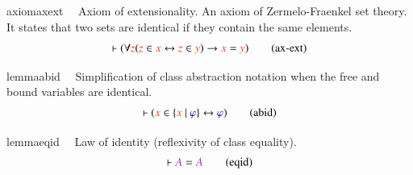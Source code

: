 \begin{restatable}{axiom}{axext}~~ Axiom of extensionality.  An axiom of
Zermelo-Fraenkel set theory.  It
       states that two sets are identical if they contain the same elements.
\begin{align}
\vdash ( \forall \msc{z} ( \msc{z} \in \msc{x} \leftrightarrow \msc{z} \in
    \msc{y} ) \rightarrow \msc{x} = \msc{y} )\label{eq:ax-ext}\tag{ax-ext}
\end{align}
\end{restatable}

\dfclab

\begin{restatable}{lemma}{abid}~~ Simplification of class abstraction notation
when the free and bound
     variables are identical.  ~
\begin{align}
\vdash ( \msc{x} \in \{ \msc{x}~\vert~\mw{\varphi} \} \leftrightarrow \mw{\varphi}
    )\label{eq:abid}\tag{abid}
\end{align}
\end{restatable}

\dfcleq

\begin{restatable}{lemma}{eqid}~~ Law of identity (reflexivity of class
equality).  
\begin{align}
\vdash \mc{A} = \mc{A}\label{eq:eqid}\tag{eqid}
\end{align}
\end{restatable}

